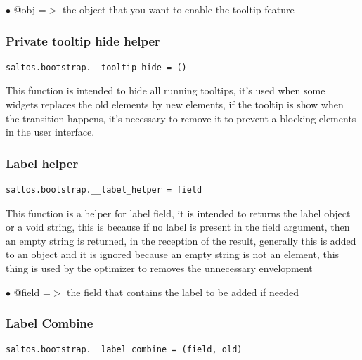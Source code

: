 \documentclass[a4paper]{article}
\begin{document}
\begin{compactitem}
\item[\color{myblue}$\bullet$] @obj =$>$ the object that you want to enable the tooltip feature
\end{compactitem}

\hypertarget{toc96}{}
\subsubsection{Private tooltip hide helper}

\begin{lstlisting}
saltos.bootstrap.__tooltip_hide = ()
\end{lstlisting}

This function is intended to hide all running tooltips, it's used when some widgets
replaces the old elements by new elements, if the tooltip is show when the transition
happens, it's necessary to remove it to prevent a blocking elements in the user
interface.

\hypertarget{toc97}{}
\subsubsection{Label helper}

\begin{lstlisting}
saltos.bootstrap.__label_helper = field
\end{lstlisting}

This function is a helper for label field, it is intended to returns the label object
or a void string, this is because if no label is present in the field argument, then
an empty string is returned, in the reception of the result, generally this is added
to an object and it is ignored because an empty string is not an element, this thing
is used by the optimizer to removes the unnecessary envelopment

\begin{compactitem}
\item[\color{myblue}$\bullet$] @field =$>$ the field that contains the label to be added if needed
\end{compactitem}

\hypertarget{toc98}{}
\subsubsection{Label Combine}

\begin{lstlisting}
saltos.bootstrap.__label_combine = (field, old)
\end{lstlisting}
\end{document}
